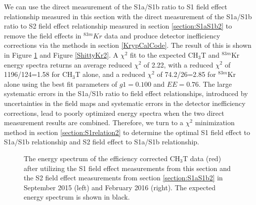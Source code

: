 \documentclass[a4paper,12pt]{article}
\begin{document}
{We can use the direct measurement of the S1a/S1b ratio to S1 field effect relationship measured in this section with the direct measurement of the S1a/S1b ratio to S2 field effect relationship measured in section \ref{section:S1aS1b2} to remove the field effects in $^{83m}Kr$ data and produce detector inefficiency corrections via the methods in section \ref{KrypCalCode}.  The result of this is shown in Figure \ref{ShittyCH3T2} and Figure \ref{ShittyKr2}.  A $\chi^2$ fit to the expected CH$_3$T and $^{83m}$Kr energy spectra returns an average reduced $\chi^2$ of 2.22, with a reduced $\chi^2$ of 1196/124=1.58 for CH$_3$T alone, and a reduced $\chi^2$ of 74.2/26=2.85 for $^{83m}$Kr alone using the best fit parameters of $g1=0.100$ and $EE=0.76$.  The large systematic errors in the S1a/S1b ratio to field effect relationships, introduced by uncertainties in the field maps and systematic errors in the detector inefficiency corrections, lead to poorly optimized energy spectra when the two direct measurement results are combined.  Therefore, we turn to a $\chi^2$ minimization method in section \ref{section:S1relation2} to determine the optimal S1 field effect to S1a/S1b relationship and S2 field effect to S1a/S1b relationship.

\newpage

\begin{figure} [h!]
\centering
{}
\qquad
{}
\caption{The energy spectrum of the efficiency corrected  CH$_3$T data (red) after utilizing the S1 field effect measurements from this section and the S2 field effect measurements from section \ref{section:S1aS1b2} in September 2015 (left) and February 2016 (right). The expected energy spectrum is shown in black. }
\label{ShittyCH3T2}
\end{figure}

}
\end{document}
